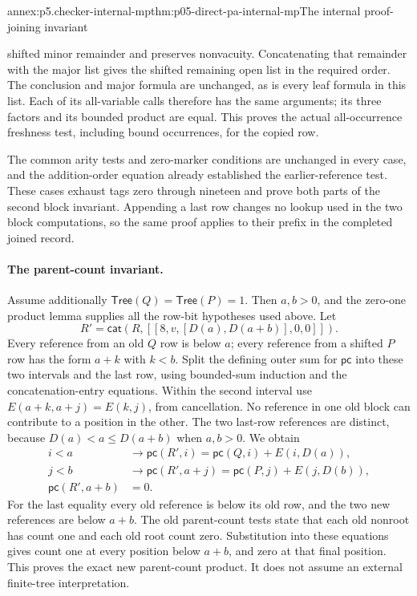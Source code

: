\begin{annexitem}{annex:p5.checker-internal-mp}{thm:p05-direct-pa-internal-mp}{The internal proof-joining invariant}
\begin{enumerate}
 shifted minor remainder and preserves nonvacuity.  Concatenating that
 remainder with the major list gives the shifted remaining open list in the
 required order.  The conclusion and major formula are unchanged, as is
 every leaf formula in this list.  Each of its all-variable calls therefore
 has the same arguments; its three factors and its bounded product are
 equal.  This proves the actual all-occurrence freshness test, including
 bound occurrences, for the copied row.
\end{enumerate}
The common arity tests and zero-marker conditions are unchanged in every
case, and the addition-order equation already established the earlier-reference
test.  These cases exhaust tags zero through nineteen and prove both parts of
the second block invariant.  Appending a last row changes no lookup used in
the two block computations, so the same proof applies to their prefix in
the completed joined record.

\paragraph{The parent-count invariant.}
Assume additionally \(\mathsf{Tree}(Q)=\mathsf{Tree}(P)=1\).
Then \(a,b>0\), and the zero-one product lemma supplies all the row-bit
hypotheses used above.  Let
\[
 R'=\mathsf{cat}(R,[[8,v,[D(a),D(a+b)],0,0]]).
\]
Every reference from an old \(Q\) row is below \(a\); every reference
from a shifted \(P\) row has the form \(a+k\) with \(k<b\).
Split the defining outer sum for \(\mathsf{pc}\) into these two intervals
and the last row, using bounded-sum induction and the concatenation-entry
equations.  Within the second interval use
\(E(a+k,a+j)=E(k,j)\), from cancellation.  No reference in one old block
can contribute to a position in the other.  The two last-row references
are distinct, because \(D(a)<a\leq D(a+b)\) when \(a,b>0\).
We obtain
\[
\begin{aligned}
 i<a&\to\mathsf{pc}(R',i)=\mathsf{pc}(Q,i)+E(i,D(a)),\\
 j<b&\to\mathsf{pc}(R',a+j)=\mathsf{pc}(P,j)+E(j,D(b)),\\
 \mathsf{pc}(R',a+b)&=0.
\end{aligned}
\]
For the last equality every old reference is below its old row, and the two
new references are below \(a+b\).  The old parent-count tests state that
each old nonroot has count one and each old root count zero.  Substitution
into these equations gives count one at every position below \(a+b\),
and zero at that final position.  This proves the exact new parent-count
product.  It does not assume an external finite-tree interpretation.


\end{annexitem}
